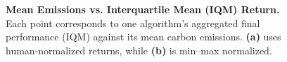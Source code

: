 \begin{figure}[htbp]
	\centering
	\quad
	\caption{\textbf{Mean Emissions vs. Interquartile Mean (IQM) Return.}
		Each point corresponds to one algorithm’s aggregated final performance (IQM) against its mean carbon emissions. 
		\textbf{(a)} uses human‐normalized returns, while \textbf{(b)} is min--max normalized.}
	\label{fig:scatter_emissions_a}
\end{figure}

